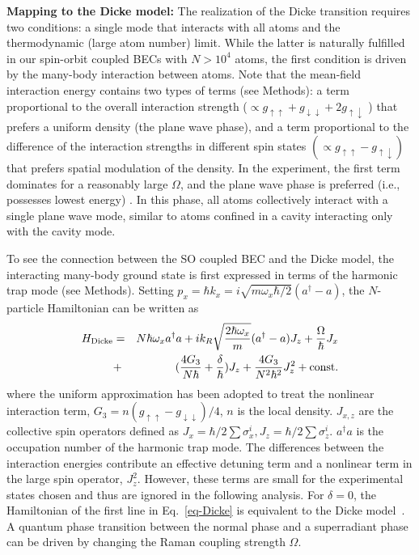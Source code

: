 \documentclass[prl,aps,twocolumn,floatfix]{revtex4}
\begin{document}
\textbf{Mapping to the Dicke model: }The realization of the Dicke transition
requires two conditions: a single mode that interacts with all atoms and the
thermodynamic (large atom number) limit. While the latter is naturally
fulfilled in our spin-orbit coupled BECs with $N>10^{4}$ atoms, the first
condition is driven by the many-body interaction between atoms. Note that
the mean-field interaction energy contains two types of terms (see Methods):
a term proportional to the overall interaction strength ($\propto
g_{\uparrow \uparrow }+g_{\downarrow \downarrow }+2g_{\uparrow \downarrow }$%
) that prefers a uniform density (the plane wave phase), and a term
proportional to the difference of the interaction strengths in different
spin states $\left( \propto g_{\uparrow \uparrow }-g_{\uparrow \downarrow
}\right) $ that prefers spatial modulation of the density. In the
experiment, the first term dominates for a reasonably large $\Omega $, and
the plane wave phase is preferred (i.e., possesses lowest energy) \cite%
{Stringari}. In this phase, all atoms collectively interact with a single
plane wave mode, similar to atoms confined in a cavity interacting only with
the cavity mode.

To see the connection between the SO coupled BEC and the Dicke model, the
interacting many-body ground state is first expressed in terms of the
harmonic trap mode (see Methods). Setting $p_{x}=\hbar k_{x}=i\sqrt{m\omega
_{x}\hbar/2 }(a^{\dagger }-a)$, the $N$-particle Hamiltonian can be written
as
\begin{eqnarray}
H_{\text{Dicke}} &=&N\hbar \omega _{x}a^{\dagger }{a}+ik_{R}\sqrt{\frac{%
2\hbar \omega _{x}}{m}}(a^{\dagger }-a)J_{z}+\frac{\Omega }{\hbar }J_{x}
\notag \\
&+&(\frac{4G_{3}}{N\hbar }+\frac{\delta }{\hbar })J_{z}+\frac{4G_{3}}{%
N^{2}\hbar ^{2}}J_{z}^{2}+\text{const}.  \label{eq-Dicke}
\end{eqnarray}%
where the uniform approximation has been adopted to treat the nonlinear
interaction term, $G_{3}=n(g_{\uparrow \uparrow }-g_{\downarrow \downarrow
})/4 $, $n$ is the local density. $J_{x,z}$ are the collective spin
operators defined as $J_{x}={\hbar/2}\sum \sigma _{x}^{i},J_{z}=\hbar/2 \sum
\sigma _{z}^{i}$. $a^{\dagger }a$ is the occupation number of the harmonic
trap mode. The differences between the interaction energies contribute an
effective detuning term and a nonlinear term in the large spin operator, $%
J_{z}^{2}$. However, these terms are small for the experimental states
chosen and thus are ignored in the following analysis. For $\delta =0$, the
Hamiltonian of the first line in Eq.~\ref{eq-Dicke} is equivalent to the
Dicke model~\cite{Dicke}. A quantum phase transition between the normal
phase and a superradiant phase can be driven by changing the Raman coupling
strength $\Omega $.
\end{document}
